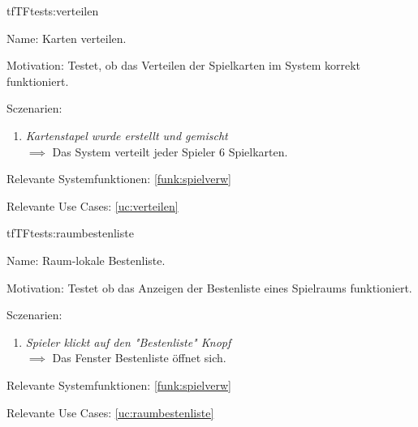 \begin{description}[leftmargin=5em, style=sameline]
\begin{lhp}{tf}{TF}{tests:verteilen}
	\item [Name:] Karten verteilen.
	\item [Motivation:] Testet, ob das Verteilen der Spielkarten im System korrekt funktioniert.
	\item [Sczenarien:] \hfill
		\begin{enumerate}
			\item \textit{Kartenstapel wurde erstellt und gemischt} \\ $\implies$ Das System verteilt jeder Spieler 6 Spielkarten.
		\end{enumerate}
	\item [Relevante Systemfunktionen:] \ref{funk:spielverw}
	\item [Relevante Use Cases:] \ref{uc:verteilen}
\end{lhp}



\begin{lhp}{tf}{TF}{tests:raumbestenliste}
	\item [Name:] Raum-lokale Bestenliste.
	\item [Motivation:] Testet ob das Anzeigen der Bestenliste eines Spielraums funktioniert.
	\item [Sczenarien:] \hfill
		\begin{enumerate}
			\item \textit{Spieler klickt auf den "Bestenliste" Knopf} \\ $\implies$ Das Fenster Bestenliste öffnet sich.
		\end{enumerate}
	\item [Relevante Systemfunktionen:] \ref{funk:spielverw}
	\item [Relevante Use Cases:] \ref{uc:raumbestenliste}
\end{lhp}
\begin{comment}
\begin{lhp}{tf}{TF}{tests:spielraum_verbindung}
	\item [Name:] \textcolor{green}{Verbindungsabbruch oder verlassen des Spiels während des Spiels}
	\item [Motivation:] \textcolor{green}{Testet ob das Spiel nach dem Verlassen oder einem Verbindungsabbruch eines Spielers wie gewollt weitergeht.}
	\item [Sczenarien:] \hfill
		\begin{enumerate}
			\item \textit{Spieler verlässt das Spiel, oder hat einen Verbindungsabbruch} \\ $\implies$ Spieler wird aus dem Spiel entfernt. Seine verbleibenden Karten werden auf den Ablagestapel gelegt und das Spiel geht weiter.
		\end{enumerate}
	\item [Relevante Systemfunktionen:] \ref{funk:spielverw}
	\item [Relevante Use Cases:] \ref{uc:spielraum}
\end{lhp}
\end{comment}


\end{description}
